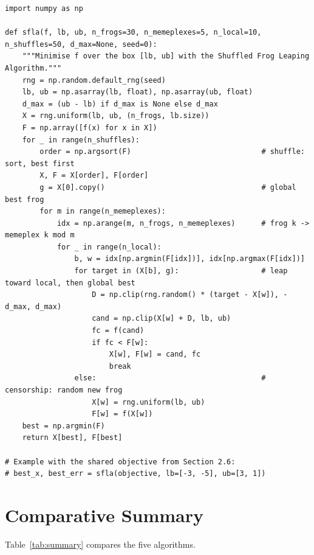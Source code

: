 \documentclass[11pt,a4paper]{article}
\begin{document}
\begin{lstlisting}
import numpy as np

def sfla(f, lb, ub, n_frogs=30, n_memeplexes=5, n_local=10, n_shuffles=50, d_max=None, seed=0):
    """Minimise f over the box [lb, ub] with the Shuffled Frog Leaping Algorithm."""
    rng = np.random.default_rng(seed)
    lb, ub = np.asarray(lb, float), np.asarray(ub, float)
    d_max = (ub - lb) if d_max is None else d_max
    X = rng.uniform(lb, ub, (n_frogs, lb.size))
    F = np.array([f(x) for x in X])
    for _ in range(n_shuffles):
        order = np.argsort(F)                              # shuffle: sort, best first
        X, F = X[order], F[order]
        g = X[0].copy()                                    # global best frog
        for m in range(n_memeplexes):
            idx = np.arange(m, n_frogs, n_memeplexes)      # frog k -> memeplex k mod m
            for _ in range(n_local):
                b, w = idx[np.argmin(F[idx])], idx[np.argmax(F[idx])]
                for target in (X[b], g):                   # leap toward local, then global best
                    D = np.clip(rng.random() * (target - X[w]), -d_max, d_max)
                    cand = np.clip(X[w] + D, lb, ub)
                    fc = f(cand)
                    if fc < F[w]:
                        X[w], F[w] = cand, fc
                        break
                else:                                      # censorship: random new frog
                    X[w] = rng.uniform(lb, ub)
                    F[w] = f(X[w])
    best = np.argmin(F)
    return X[best], F[best]

# Example with the shared objective from Section 2.6:
# best_x, best_err = sfla(objective, lb=[-3, -5], ub=[3, 1])
\end{lstlisting}

\section{Comparative Summary}
\label{sec:summary}

Table~\ref{tab:summary} compares the five algorithms.
\end{document}
